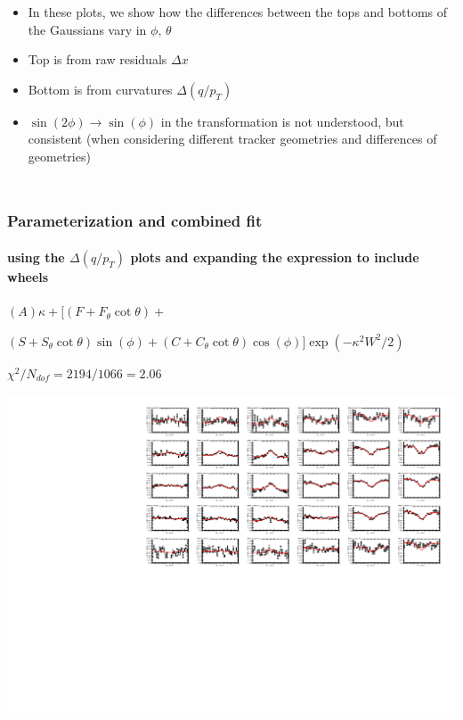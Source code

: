 \documentclass[compress]{beamer}
\begin{document}
\begin{frame}
\begin{columns}
\begin{itemize}
\item In these plots, we show how the differences between the tops and
  bottoms of the Gaussians vary in $\phi$, $\theta$
\item Top is from raw residuals $\Delta x$
\item Bottom is from curvatures $\Delta(q/p_T)$
\item $\sin(2\phi) \to \sin(\phi)$ in the transformation is not
  understood, but consistent {\scriptsize (when considering different
    tracker geometries and differences of geometries)}
\end{itemize}
\end{columns}
\end{frame}

\begin{frame}
\frametitle{{\large Parameterization and combined fit}}
\framesubtitle{using the $\Delta(q/p_T)$ plots and expanding the expression to include wheels}

$(A)\kappa + \big[(F + F_{\theta}\cot\theta) + $

\hfill $(S + S_{\theta}\cot\theta)\sin(\phi) + (C + C_{\theta}\cot\theta)\cos(\phi)\big]\exp(-\kappa^2 W^2 / 2)$

\begin{center}
$\chi^2/N_{dof} = 2194/1066 = 2.06$
\end{center}
\includegraphics[width=0.9\linewidth]{allfits.pdf}
\end{frame}
\end{document}

